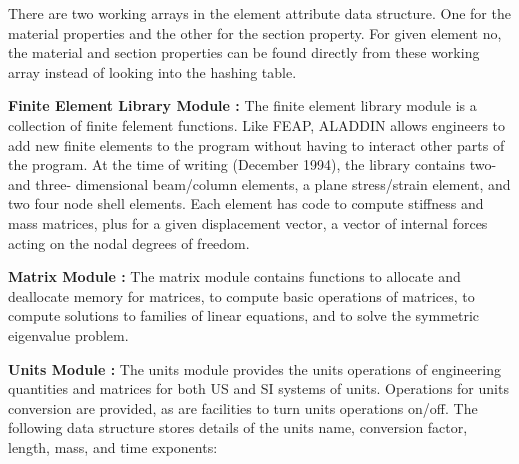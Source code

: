 \vspace{0.05 in}\noindent
There are two working arrays in the element attribute data structure.
One for the material properties and the other for the section property.
For given element no, the material and section properties can be
found directly from these working array instead of looking into the hashing table.

\vspace{0.15 in}\noindent
{\bf Finite Element Library Module :}
The finite element library module is a
collection of finite felement functions.
Like FEAP, ALADDIN allows engineers to add new finite
elements to the program without having to interact
other parts of the program. At the time of writing (December 1994),
the library contains two- and three- dimensional beam/column elements,
a plane stress/strain element, and two four node shell elements.
Each element has code to compute stiffness and mass matrices,
plus for a given displacement vector,
a vector of internal forces acting on the nodal degrees of freedom.

\vspace{0.15 in}\noindent
{\bf Matrix Module :}
The matrix module contains functions to allocate and deallocate memory for matrices,
to compute basic operations of matrices, to compute solutions
to families of linear equations, and to solve the symmetric eigenvalue problem.

\vspace{0.15 in}\noindent
{\bf Units Module :}
The units module provides the units operations of engineering quantities and
matrices for both US and SI systems of units.
Operations for units conversion are provided,
as are facilities to turn units operations on/off.
The following data structure stores details of
the units name, conversion factor, length, mass,
and time exponents:

